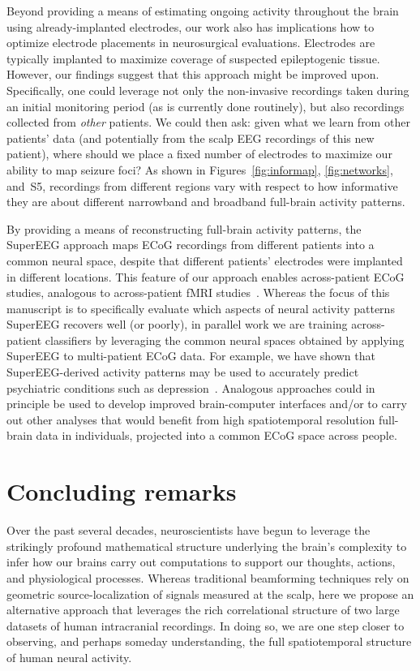 \documentclass[11pt]{article}
\newcommand{\networkpower}{S5}
\begin{document}
Beyond providing a means of estimating ongoing activity throughout the brain
using already-implanted electrodes, our work also has implications how to
optimize electrode placements in neurosurgical evaluations. Electrodes are
typically implanted to maximize coverage of suspected epileptogenic tissue.
However, our findings suggest that this approach might be improved upon.
Specifically, one could leverage not only the non-invasive recordings taken
during an initial monitoring period (as is currently done routinely), but also
recordings collected from \textit{other} patients.  We could then ask: given
what we learn from other patients' data (and potentially from the scalp EEG
recordings of this new patient), where should we place a fixed number of
electrodes to maximize our ability to map seizure foci?  As shown in
Figures~\ref{fig:informap}, \ref{fig:networks}, and~\networkpower, recordings
from different regions vary with respect to how informative they are about
different narrowband and broadband full-brain activity patterns.

By providing a means of reconstructing full-brain activity patterns, the
SuperEEG approach maps ECoG recordings from different patients into a common
neural space, despite that different patients' electrodes were implanted in
different locations. This feature of our approach enables across-patient ECoG
studies, analogous to across-patient fMRI studies~\citep[e.g.,][]{HaxbEtal01,
NormEtal06, HaxbEtal11}. Whereas the focus of this manuscript is to specifically
evaluate which aspects of neural activity patterns SuperEEG recovers well (or
poorly), in parallel work we are training across-patient classifiers by
leveraging the common neural spaces obtained by applying SuperEEG to
multi-patient ECoG data.  For example, we have shown that SuperEEG-derived
activity patterns may be used to accurately predict psychiatric conditions such
as depression~\citep{ScanEtal20}.  Analogous approaches could in principle be
used to develop improved brain-computer interfaces and/or to carry out other
analyses that would benefit from high spatiotemporal resolution full-brain data
in individuals, projected into a common ECoG space across people.


\section*{Concluding remarks}
Over the past several decades, neuroscientists
have begun to leverage the strikingly profound mathematical structure underlying
the brain's complexity to infer how our brains carry out computations to support
our thoughts, actions, and physiological processes.  Whereas traditional
beamforming techniques rely on geometric source-localization of signals measured
at the scalp, here we propose an alternative approach that leverages the rich
correlational structure of two large datasets of human intracranial recordings.
In doing so, we are one step closer to observing, and perhaps someday
understanding, the full spatiotemporal structure of human neural activity.
\end{document}
